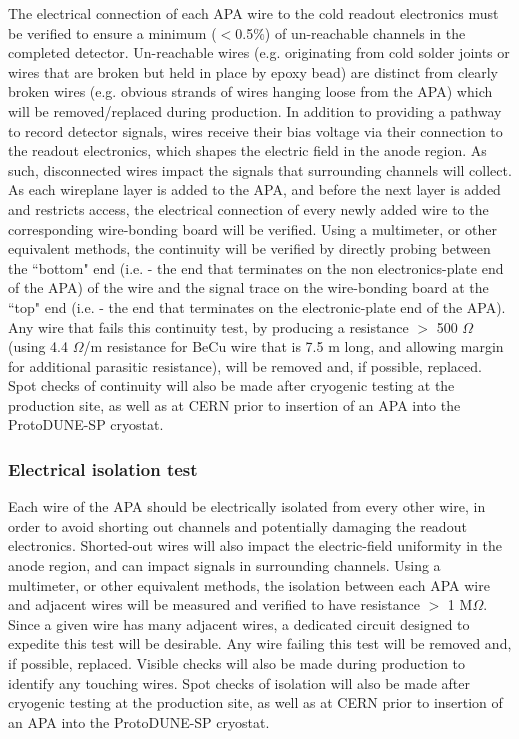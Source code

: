The electrical connection of each APA wire to the cold readout electronics must be verified to ensure a minimum ($<$0.5$\%$) of un-reachable channels in the completed detector.  Un-reachable wires (e.g. originating from cold solder joints or wires that are broken but held in place by epoxy bead) are distinct from clearly broken wires (e.g. obvious strands of wires hanging loose from the APA) which will be removed/replaced during production.   In addition to providing a pathway to record detector signals, wires receive their bias voltage via their connection to the readout electronics, which shapes the electric field in the anode region.  As such, disconnected wires impact the signals that surrounding channels will collect.  As each wireplane layer is added to the APA, and before the next layer is added and restricts access, the electrical connection of every newly added wire to the corresponding wire-bonding board will be verified.  Using a multimeter, or other equivalent methods, the continuity will be verified by directly probing between the ``bottom" end (i.e. - the end that terminates on the non electronics-plate end of the APA) of the wire and the signal trace on the wire-bonding board at the ``top" end (i.e. - the end that terminates on the electronic-plate end of the APA).  Any wire that fails this continuity test, by producing a resistance $>$ 500 $\Omega$ (using 4.4 $\Omega$/m resistance for BeCu wire that is 7.5 m long, and allowing margin for additional parasitic resistance), will be removed and, if possible, replaced.  Spot checks of continuity will also be made after cryogenic testing at the production site, as well as at CERN prior to insertion of an APA into the ProtoDUNE-SP cryostat.

\subsubsection{Electrical isolation test}

Each wire of the APA should be electrically isolated from every other wire, in order to avoid shorting out channels and potentially damaging the readout electronics.  Shorted-out wires will also impact the electric-field uniformity in the anode region, and can impact signals in surrounding channels.  Using a multimeter, or other equivalent methods, the isolation between each APA wire and adjacent wires will be measured and verified to have resistance $>$ 1 M$\Omega$.  Since a given wire has many adjacent wires, a dedicated circuit designed to expedite this test will be desirable.  Any wire failing this test will be removed and, if possible, replaced.  Visible checks will also be made during production to identify any touching wires.  Spot checks of isolation will also be made after cryogenic testing at the production site, as well as at CERN prior to insertion of an APA into the ProtoDUNE-SP cryostat.

